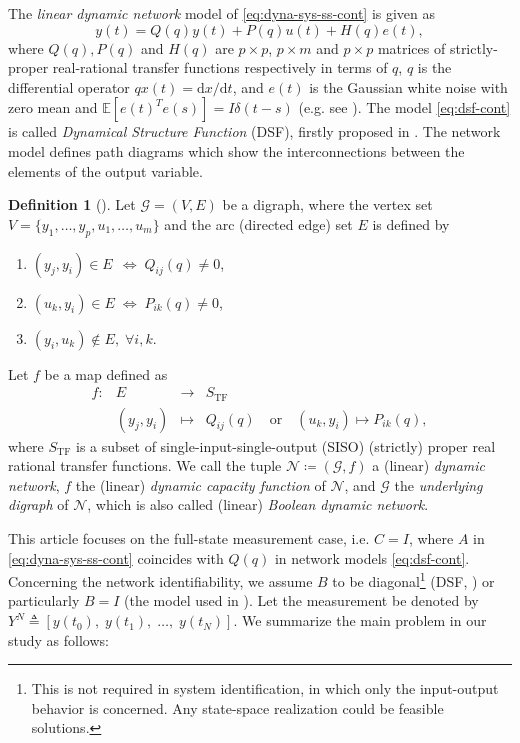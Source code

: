 \documentclass[letterpaper,10pt,journal,final]{IEEEtran}
\theoremstyle{definition}
\newtheorem{definition}[theorem]{Definition}
\theoremstyle{remark}
\begin{document}
The \emph{linear dynamic network} model of \eqref{eq:dyna-sys-ss-cont} is given as
\begin{equation}
  \label{eq:dsf-cont}
  y(t) = Q(q) y(t) + P(q) u(t) + H(q) e(t),
\end{equation}
where $Q(q),P(q)$ and $H(q)$ are $p \times p$, $p\times m$ and $p \times p$ matrices of
strictly-proper real-rational transfer functions respectively in terms of $q$, $q$ is
the differential operator $q x(t) = \mathrm{d}x/\mathrm{d} t$, and $e(t)$ is the
Gaussian white noise with zero mean and $\mathbb{E}[e(t)^T e(s)] = I\delta(t-s)$
(e.g. see \cite{Hayden2016a}). The model \eqref{eq:dsf-cont} is called
\emph{Dynamical Structure Function} (DSF), firstly proposed in \cite{Goncalves2008}.
The network model defines path diagrams which show the interconnections between the
elements of the output variable.
\begin{definition}[\cite{Yue2017a}]
  \label{def:LTI-dynamic-network}
  Let $\mathcal{G} = (V,E)$ be a digraph,
  where the vertex set $V = \{y_1, \dots, y_p, u_1, \dots, u_m\}$
and the arc (directed edge) set $E$ is defined by
  \begin{enumerate}[label=\roman*),itemindent=8pt]
  \item $(y_j, y_i) \in E\;\, \Leftrightarrow\; Q_{ij}(q) \neq 0$,
  \item $(u_k, y_i) \in E\; \Leftrightarrow\; P_{ik}(q) \neq 0$,
  \item $(y_i, u_k) \notin E, \; \forall i,k$.
  \end{enumerate}
  Let $f$ be a map defined as
  \begin{equation*}
    \begin{array}{rrll}
      f: & E & \rightarrow & S_\text{TF} \\
         & (y_j, y_i) & \mapsto & Q_{ij}(q) \quad \mathrm{or} \quad (u_k, y_i)  \mapsto  P_{ik}(q),
    \end{array}
  \end{equation*}
  where $S_\text{TF}$ is a subset of single-input-single-output (SISO) (strictly) proper real rational transfer functions.
  We call the tuple $\mathcal{N} \coloneqq (\mathcal{G}, f)$ a (linear) \emph{dynamic network},  $f$ the (linear) \emph{dynamic capacity function} of $\mathcal{N}$, and $\mathcal{G}$ the \emph{underlying digraph} of $\mathcal{N}$, which is also called (linear) \emph{Boolean dynamic network}.
\end{definition}

This article focuses on the full-state measurement case, i.e. $C = I$, where $A$ in
\eqref{eq:dyna-sys-ss-cont} coincides with $Q(q)$ in network models
\eqref{eq:dsf-cont}.
Concerning the network identifiability\cite{Goncalves2008}, we assume $B$ to be
diagonal\footnote{This is not required in system identification, in which only the
  input-output behavior is concerned. Any state-space realization could be feasible
  solutions.} (DSF, \cite{Goncalves2008}) or particularly $B = I$ (the model used in
\cite{VandenHof2013}).  Let the measurement be denoted by
\begin{math}
  Y^N \triangleq [ y(t_0), \; y(t_1), \; \dots, \; y(t_N) ].
\end{math}
We summarize the main problem in our study as follows:
\end{document}
